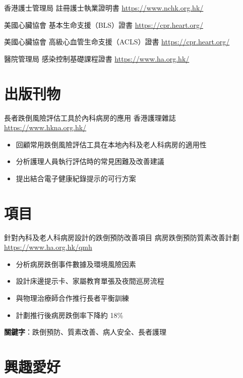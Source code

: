 \documentclass[a4paper, serif, 10pt]{moderncv}
\begin{document}
        {香港護士管理局}
        {註冊護士執業證明書}
        {\url{https://www.nchk.org.hk/}}
        {}
        {}

        {美國心臟協會}
        {基本生命支援（BLS）證書}
        {\url{https://cpr.heart.org/}}
        {}
        {}

        {美國心臟協會}
        {高級心血管生命支援（ACLS）證書}
        {\url{https://cpr.heart.org/}}
        {}
        {}

        {醫院管理局}
        {感染控制基礎課程證書}
        {\url{https://www.ha.org.hk/}}
        {}
        {}
\section{出版刊物}

        {長者跌倒風險評估工具於內科病房的應用}
        {香港護理雜誌}
        {\url{https://www.hkna.org.hk/}}
        {}
        {\begin{itemize}
\item 回顧常用跌倒風險評估工具在本地內科及老人科病房的適用性
\item 分析護理人員執行評估時的常見困難及改善建議
\item 提出結合電子健康紀錄提示的可行方案
\end{itemize}}
\section{項目}

        {針對內科及老人科病房設計的跌倒預防改善項目}
        {病房跌倒預防質素改善計劃}
        {\url{https://www.ha.org.hk/qmh}}
        {}
        {\begin{itemize}
\item 分析病房跌倒事件數據及環境風險因素
\item 設計床邊提示卡、家屬教育單張及夜間巡房流程
\item 與物理治療師合作推行長者平衡訓練
\item 計劃推行後病房跌倒率下降約 18\%
\end{itemize}
\textbf{關鍵字}：跌倒預防、質素改善、病人安全、長者護理}
\section{興趣愛好}

\end{document}
